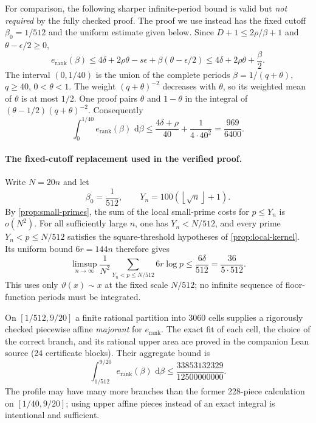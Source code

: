 \documentclass[11pt,letterpaper]{article}
\theoremstyle{definition}
\newcommand{\dd}{\,\mathrm d}
\newcommand{\floor}[1]{\left\lfloor #1\right\rfloor}
\begin{document}
For comparison, the following sharper infinite-period bound is valid but
\emph{not required} by the fully checked proof. The proof we use instead
has the fixed cutoff $\beta_0=1/512$ and the uniform estimate given
below. Since
$D+1\le2\rho/\beta+1$ and $\theta-\epsilon/2\ge0$,
\[
 e_{\mathrm{rank}}(\beta)
 \le4\delta+2\rho\theta-s\epsilon
                   +\beta(\theta-\epsilon/2)
 \le4\delta+2\rho\theta+\frac{\beta}{2}.
\]
The interval $(0,1/40)$ is the union of the complete periods
$\beta=1/(q+\theta)$, $q\ge40$, $0<\theta<1$.
The weight $(q+\theta)^{-2}$ decreases with $\theta$, so its weighted
mean of $\theta$ is at most $1/2$. One proof pairs $\theta$ and $1-\theta$
in the integral of $(\theta-1/2)(q+\theta)^{-2}$.
Consequently
\begin{equation}\label{eq:small-profile-tail}
 \int_0^{1/40}e_{\mathrm{rank}}(\beta)\,\dd\beta
 \le\frac{4\delta+\rho}{40}
           +\frac{1}{4\cdot40^2}
 =\frac{969}{6400}.
\end{equation}

\paragraph{The fixed-cutoff replacement used in the verified proof.}
Write $N=20n$ and let
\[
 \beta_0=\frac1{512},\qquad
 Y_n=100(\floor{\sqrt n}+1).
\]
By \cref{prop:small-primes}, the sum of the local small-prime costs for
$p\le Y_n$ is $o(N^2)$. For all sufficiently large $n$, one has
$Y_n<N/512$, and every prime $Y_n<p\le N/512$ satisfies the
square-threshold hypotheses of \cref{prop:local-kernel}. Its uniform
bound $6r=144n$ therefore gives
\begin{equation}\label{eq:verified-small-tail}
 \limsup_{n\to\infty}\frac1{N^2}
 \sum_{Y_n<p\le N/512}6r\log p
 \le\frac{6\delta}{512}=\frac{36}{5\cdot512}.
\end{equation}
This uses only $\vartheta(x)\sim x$ at the fixed scale $N/512$;
no infinite sequence of floor-function periods must be integrated.

On $[1/512,9/20]$ a finite rational partition into $3060$ cells
supplies a rigorously checked piecewise affine \emph{majorant} for
$e_{\mathrm{rank}}$. The exact fit of each cell, the choice of the
correct branch, and its rational upper area are proved in the companion
Lean source (24 certificate blocks). Their aggregate bound is
\begin{equation}\label{eq:verified-middle-area}
 \int_{1/512}^{9/20}e_{\mathrm{rank}}(\beta)\,\dd\beta
 \le\frac{33853132329}{12500000000}.
\end{equation}
The profile may have many more branches than the former 228-piece
calculation on $[1/40,9/20]$; using upper affine pieces instead of
an exact integral is intentional and sufficient.
\end{document}

